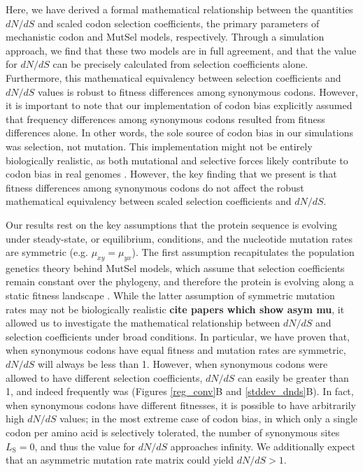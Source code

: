 \documentclass[11pt]{article}
\begin{document}
Here, we have derived a formal mathematical relationship between the quantities $dN/dS$ and scaled codon selection coefficients, the primary parameters of mechanistic codon and MutSel models, respectively. Through a simulation approach, we find that these two models are in full agreement, and that the value for $dN/dS$ can be precisely calculated from selection coefficients alone. Furthermore, this mathematical equivalency between selection coefficients and $dN/dS$ values is robust to fitness differences among synonymous codons. However, it is important to note that our implementation of codon bias explicitly assumed that frequency differences among synonymous codons resulted from fitness differences alone. In other words, the sole source of codon bias in our simulations was selection, not mutation. This implementation might not be entirely biologically realistic, as both mutational and selective forces likely contribute to codon bias in real genomes \cite{Blumer1991, Duret2002, HershbergPetrov2008, PlotkinKudla2010}. However, the key finding that we present is that fitness differences among synonymous codons do not affect the robust mathematical equivalency between scaled selection coefficients and $dN/dS$. 


Our results rest on the key assumptions that the protein sequence is evolving under steady-state, or equilibrium, conditions, and the nucleotide mutation rates are symmetric (e.g. $\mu_{xy} = \mu_{yx}$). The first assumption recapitulates the population genetics theory behind MutSel models, which assume that selection coefficients remain constant over the phylogeny, and therefore the protein is evolving along a static fitness landscape \cite{HalpernBruno1998,Rodrigueetal2010,Tamurietal2012}. While the latter assumption of symmetric mutation rates may not be biologically realistic \textbf{cite papers which show asym mu}, it allowed us to investigate the mathematical relationship between $dN/dS$ and selection coefficients under broad conditions. In particular, we have proven that, when synonymous codons have equal fitness and mutation rates are symmetric, $dN/dS$ will always be less than 1. However, when synonymous codons were allowed to have different selection coefficients, $dN/dS$ can easily be greater than 1, and indeed frequently was (Figures \ref{reg_conv}B and \ref{stddev_dnds}B). In fact, when synonymous codons have different fitnesses, it is possible to have arbitrarily high $dN/dS$ values; in the most extreme case of codon bias, in which only a single codon per amino acid is selectively tolerated, the number of synonymous sites $L_\text{S} = 0$, and thus the value for $dN/dS$ approaches infinity. We additionally expect that an asymmetric mutation rate matrix could yield $dN/dS > 1$.
\end{document}
